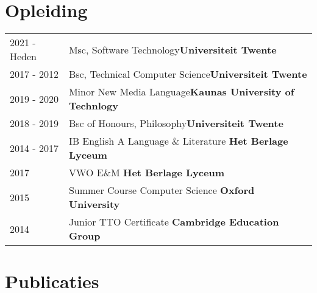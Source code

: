 \documentclass[a4paper,12pt]{article}
\begin{document}
\section{Opleiding}
\begin{tabularx}{\linewidth}{@{}l X@{}}	
2021 - Heden & Msc, Software Technology\hfill \textbf{Universiteit Twente} \\

2017 - 2012 & Bsc, Technical Computer Science\hfill \textbf{Universiteit Twente} \\ 

2019 - 2020 & Minor New Media Language\hfill \textbf{Kaunas University of Technlogy} \\

2018 - 2019 & Bsc of Honours, Philosophy\hfill \textbf{Universiteit Twente} \\

2014 - 2017 & IB English A Language \& Literature \hfill \textbf{Het Berlage Lyceum} \\

2017 & VWO E\&M \hfill \textbf{Het Berlage Lyceum} \\

2015 & Summer Course Computer Science \hfill \textbf{Oxford University} \\

2014 & Junior TTO Certificate \hfill \textbf{Cambridge Education Group} \\
\end{tabularx}

\section{Publicaties}
\begin{refsection}
\printbibliography[heading=none]
\nocite{*}
\end{refsection}

\end{document}
